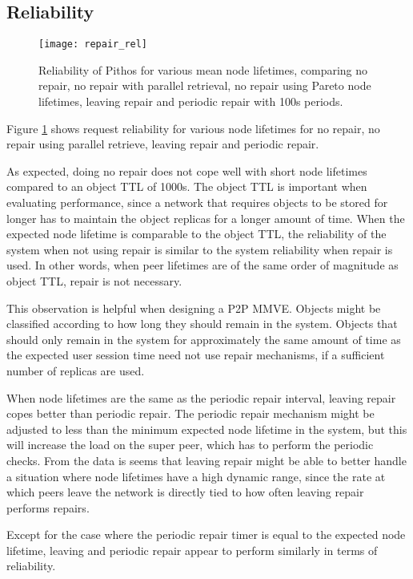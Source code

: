 \subsection{Reliability}

\begin{figure}[htbp]
 \centering
 \texttt{[image: repair\_rel]}
 \caption{Reliability of Pithos for various mean node lifetimes, comparing no repair, no repair with parallel retrieval, no repair using Pareto node lifetimes, leaving repair and periodic repair with 100s periods.}
 \label{fig_repair_rel}
\end{figure}
%
Figure \ref{fig_repair_rel} shows request reliability for various node lifetimes for no repair, no repair using parallel retrieve, leaving repair and periodic repair.

As expected, doing no repair does not cope well with short node lifetimes compared to an object TTL of 1000s. The object TTL is important when evaluating performance, since a network that requires objects to be stored for longer has to maintain the object replicas for a longer amount of time. When the expected node lifetime is comparable to the object TTL, the reliability of the system when not using repair is similar to the system reliability when repair is used. In other words, when peer lifetimes are of the same order of magnitude as object TTL, repair is not necessary.

This observation is helpful when designing a P2P MMVE. Objects might be classified according to how long they should remain in the system. Objects that should only remain in the system for approximately the same amount of time as the expected user session time need not use repair mechanisms, if a sufficient number of replicas are used.

When node lifetimes are the same as the periodic repair interval, leaving repair copes better than periodic repair. The periodic repair mechanism might be adjusted to less than the minimum expected node lifetime in the system, but this will increase the load on the super peer, which has to perform the periodic checks. From the data is seems that leaving repair might be able to better handle a situation where node lifetimes have a high dynamic range, since the rate at which peers leave the network is directly tied to how often leaving repair performs repairs.

Except for the case where the periodic repair timer is equal to the expected node lifetime, leaving and periodic repair appear to perform similarly in terms of reliability.


